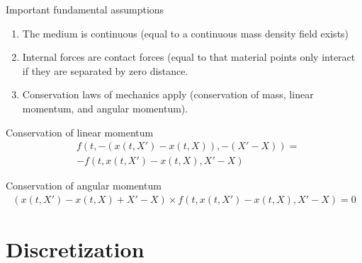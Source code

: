 \documentclass[\classoption]{beamer}
\begin{document}
\begin{frame}{Important fundamental assumptions}
\begin{enumerate}
\item The medium is continuous (equal to a continuous mass density field exists)
\item Internal forces are contact forces (equal to that material points only interact if they are separated by zero distance.
\item Conservation laws of mechanics apply (conservation of mass, linear momentum, and angular momentum).
\end{enumerate}

\begin{block}{Conservation of linear momentum}
\vspace*{-0.5cm}
\begin{align*}
&f(t,-(x(t,X')-x(t,X)),-(X'-X))= \\ &-f(t,x(t,X')-x(t,X), X'-X)
\end{align*}

\end{block}
\vspace*{-0.5cm}
\begin{block}{Conservation of angular momentum}
\vspace*{-0.5cm}
\begin{align*}
(x(t,X')-x(t,X)+X'-X) \times f\left(t,x(t,X')-x(t,X), X'-X\right) = 0
\end{align*}
\end{block}

\end{frame}

\section{Discretization}
\end{document}
